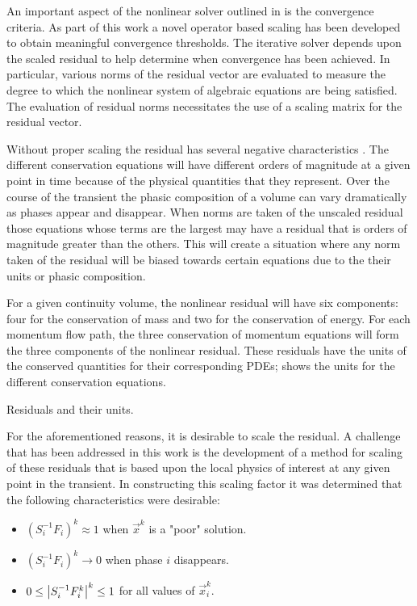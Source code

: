 An important aspect of the nonlinear solver outlined in  is the convergence criteria.
As part of this work a novel operator based scaling has been developed to obtain meaningful convergence thresholds.
The iterative solver depends upon the scaled residual to help determine when convergence has been achieved.
In particular, various norms of the residual vector are evaluated to measure the degree to which the nonlinear system of algebraic equations are being satisfied.
The evaluation of residual norms necessitates the use of a scaling matrix for the residual vector.

Without proper scaling the residual has several negative characteristics \cite{Frepoli2003, McHugh1995}.
The different conservation equations will have different orders of magnitude at a given point in time because of the physical quantities that they represent.
Over the course of the transient the phasic composition of a volume can vary dramatically as phases appear and disappear.
When norms are taken of the unscaled residual those equations whose terms are the largest may have a residual that is orders of magnitude greater than the others.
This will create a situation where any norm taken of the residual will be biased towards certain equations due to the their units or phasic composition.

For a given continuity volume, the nonlinear residual will have six components: four for the conservation of mass and two for the conservation of energy.
For each momentum flow path, the three conservation of momentum equations will form the three components of the nonlinear residual.
These residuals have the units of the conserved quantities for their corresponding PDEs;  shows the units for the different conservation equations.

\begin{table}[ht!]
\centering

\caption{Residuals and their units.}
\label{tab:scaling_units_scales}
\end{table}

For the aforementioned reasons, it is desirable to scale the residual.
A challenge that has been addressed in this work is the development of a method for scaling of these residuals that is based upon the local physics of interest at any given point in the transient.
In constructing this scaling factor it was determined that the following characteristics were desirable:

\begin{itemize}
\item{$(S_{i}^{-1} F_i)^{k} \approx 1$ when $\vec{x}^{k}$ is a "poor" solution.}
\item{$(S_{i}^{-1} F_i)^{k} \rightarrow 0$ when phase $i$ disappears.}
\item{$0 \leq \left|S_{i}^{-1} F^{k}_{i}\right|^{k} \leq 1 $ for all values of $\vec{x}^{k}_i$.}
\end{itemize}


